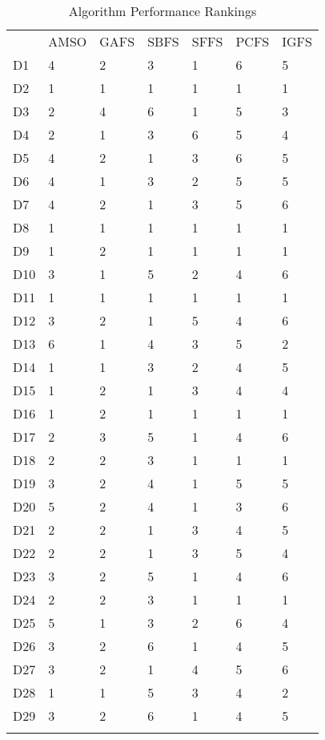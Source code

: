 \begin{table}
\caption{Algorithm Performance Rankings}
\label{tbl:algorithm:rank}
\begin{tabular}{lllllll}
\noalign{\smallskip}\hline\noalign{\smallskip}
&AMSO&GAFS&SBFS&SFFS&PCFS&IGFS\\
\noalign{\smallskip}\hline
D1&4&2&3&1&6&5\\
D2&1&1&1&1&1&1\\
D3&2&4&6&1&5&3\\
D4&2&1&3&6&5&4\\
D5&4&2&1&3&6&5\\
D6&4&1&3&2&5&5\\
D7&4&2&1&3&5&6\\
D8&1&1&1&1&1&1\\
D9&1&2&1&1&1&1\\
D10&3&1&5&2&4&6\\
D11&1&1&1&1&1&1\\
D12&3&2&1&5&4&6\\
D13&6&1&4&3&5&2\\
D14&1&1&3&2&4&5\\
D15&1&2&1&3&4&4\\
D16&1&2&1&1&1&1\\
D17&2&3&5&1&4&6\\
D18&2&2&3&1&1&1\\
D19&3&2&4&1&5&5\\
D20&5&2&4&1&3&6\\
D21&2&2&1&3&4&5\\
D22&2&2&1&3&5&4\\
D23&3&2&5&1&4&6\\
D24&2&2&3&1&1&1\\
D25&5&1&3&2&6&4\\
D26&3&2&6&1&4&5\\
D27&3&2&1&4&5&6\\
D28&1&1&5&3&4&2\\
D29&3&2&6&1&4&5\\
\noalign{\smallskip}\hline
\end{tabular}
\end{table}
